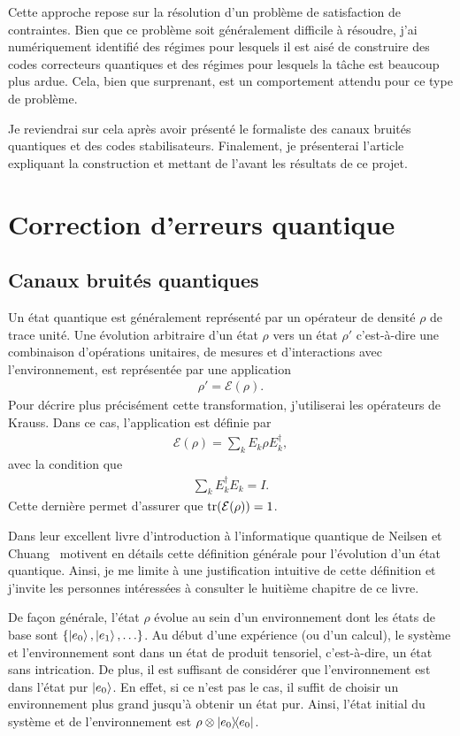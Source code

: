 Cette approche repose sur la résolution d'un problème de satisfaction de contraintes.
Bien que ce problème soit généralement difficile à résoudre,
j'ai numériquement identifié des régimes pour lesquels il est aisé de
construire des codes correcteurs quantiques
et des régimes pour lesquels la tâche est beaucoup plus ardue.
Cela, bien que surprenant, est un comportement attendu pour ce type de problème.

Je reviendrai sur cela après avoir présenté le formaliste des canaux bruités quantiques 
et des codes stabilisateurs.
Finalement,
je présenterai l'article expliquant la construction et 
mettant de l'avant les résultats de ce projet.

\section{Correction d'erreurs quantique}

\subsection{Canaux bruités quantiques}

Un état quantique est généralement représenté par un opérateur de densité $\rho$
de trace unité.
Une évolution arbitraire d'un état $\rho$ vers un état $\rho'$
c'est-à-dire une combinaison d'opérations unitaires,
de mesures et d'interactions avec l'environnement, 
est représentée par une application
\begin{align}
  \rho' = \mathcal{E}(\rho).
\end{align}
Pour décrire plus précisément cette transformation,
j'utiliserai les opérateurs de Krauss.
Dans ce cas,
l'application est définie par
\begin{align}
  \mathcal{E}(\rho) = \sum_{k} E_k \rho E_k^\dag,
\end{align}
avec la condition que 
\begin{align}
  \sum_k E_k^\dag E_k = I.
\end{align}
Cette dernière permet d'assurer que $\tr(\mathcal{E}(\rho)) = 1$.

Dans leur excellent livre d'introduction à l'informatique quantique de 
Neilsen et Chuang~\cite{nielsen_quantum_2010} motivent en détails 
cette définition générale pour l'évolution d'un état quantique.
Ainsi, je me limite à une justification intuitive de cette définition
et j'invite les personnes intéressées à consulter le huitième chapitre de ce livre.

De façon générale,
l'état $\rho$ évolue au sein d'un environnement dont les états de base 
sont $\qty{\ket{e_0}, \ket{e_1}, \ldots}$.
Au début d'une expérience (ou d'un calcul),
le système et l'environnement sont dans un état de produit tensoriel,
c'est-à-dire, un état sans intrication.
De plus, il est suffisant de considérer que l'environnement est dans l'état 
pur $\ket{e_0}$.
En effet,
si ce n'est pas le cas, il suffit de choisir un environnement plus grand jusqu'à 
obtenir un état pur.
Ainsi,
l'état initial du système et de l'environnement est $\rho \otimes \op{e_0}$.

